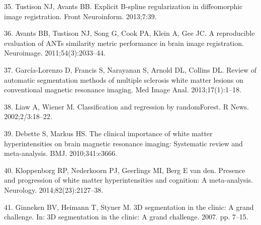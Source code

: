 \documentclass[11pt,]{article}
\begin{document}
\hypertarget{ref-Tustison:2013ac}{}
35. Tustison NJ, Avants BB. Explicit B-spline regularization in
diffeomorphic image registration. Front Neuroinform. 2013;7:39.

\hypertarget{ref-Avants:2011ab}{}
36. Avants BB, Tustison NJ, Song G, Cook PA, Klein A, Gee JC. A
reproducible evaluation of ANTs similarity metric performance in brain
image registration. Neuroimage. 2011;54(3):2033--44.

\hypertarget{ref-Garcia-Lorenzo:2013aa}{}
37. García-Lorenzo D, Francis S, Narayanan S, Arnold DL, Collins DL.
Review of automatic segmentation methods of multiple sclerosis white
matter lesions on conventional magnetic resonance imaging. Med Image
Anal. 2013;17(1):1--18.

\hypertarget{ref-liaw2002}{}
38. Liaw A, Wiener M. Classification and regression by randomForest. R
News. 2002;2/3:18--22.

\hypertarget{ref-Debette:2010aa}{}
39. Debette S, Markus HS. The clinical importance of white matter
hyperintensities on brain magnetic resonance imaging: Systematic review
and meta-analysis. BMJ. 2010;341:c3666.

\hypertarget{ref-Kloppenborg:2014aa}{}
40. Kloppenborg RP, Nederkoorn PJ, Geerlings MI, Berg E van den.
Presence and progression of white matter hyperintensities and cognition:
A meta-analysis. Neurology. 2014;82(23):2127--38.

\hypertarget{ref-vanginneken:2007aa}{}
41. Ginneken BV, Heimann T, Styner M. 3D segmentation in the clinic: A
grand challenge. In: 3D segmentation in the clinic: A grand challenge.
2007. pp. 7--15.
\end{document}
